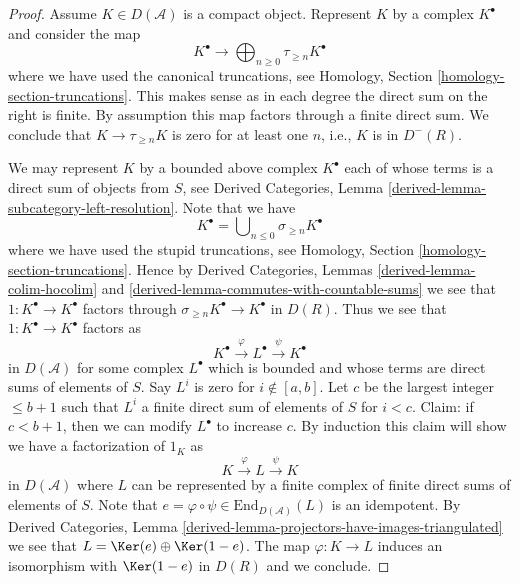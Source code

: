 \begin{proof}
Assume $K \in D(\mathcal{A})$ is a compact object. Represent $K$ by a complex
$K^\bullet$ and consider the map
$$
K^\bullet
\longrightarrow
\bigoplus\nolimits_{n \geq 0} \tau_{\geq n} K^\bullet
$$
where we have used the canonical truncations, see
Homology, Section \ref{homology-section-truncations}.
This makes sense as in each degree the direct sum on the right is finite.
By assumption this map factors through a finite direct sum.
We conclude that $K \to \tau_{\geq n} K$ is zero for at least one $n$,
i.e., $K$ is in $D^{-}(R)$.

\medskip\noindent
We may represent $K$ by a bounded above complex $K^\bullet$ each of whose
terms is a direct sum of objects from $S$, see
Derived Categories, Lemma \ref{derived-lemma-subcategory-left-resolution}.
Note that we have
$$
K^\bullet = \bigcup\nolimits_{n \leq 0} \sigma_{\geq n}K^\bullet
$$
where we have used the stupid truncations, see
Homology, Section \ref{homology-section-truncations}.
Hence by Derived Categories, Lemmas \ref{derived-lemma-colim-hocolim} and
\ref{derived-lemma-commutes-with-countable-sums}
we see that $1 : K^\bullet \to K^\bullet$ factors through
$\sigma_{\geq n}K^\bullet \to K^\bullet$ in $D(R)$.
Thus we see that $1 : K^\bullet \to K^\bullet$ factors as
$$
K^\bullet \xrightarrow{\varphi} L^\bullet \xrightarrow{\psi} K^\bullet
$$
in $D(\mathcal{A})$ for some complex $L^\bullet$ which is bounded and
whose terms are direct sums of elements of $S$. Say $L^i$ is zero for
$i \not \in [a, b]$. Let $c$ be the largest integer $\leq b + 1$ such
that $L^i$ a finite direct sum of elements of $S$ for $i < c$.
Claim: if $c < b + 1$, then we can modify $L^\bullet$ to increase $c$.
By induction this claim will show we have a factorization
of $1_K$ as
$$
K \xrightarrow{\varphi} L \xrightarrow{\psi} K
$$
in $D(\mathcal{A})$ where $L$ can be represented by a finite
complex of finite direct sums of elements of $S$. Note that
$e = \varphi \circ \psi \in \text{End}_{D(\mathcal{A})}(L)$
is an idempotent. By Derived Categories,
Lemma \ref{derived-lemma-projectors-have-images-triangulated}
we see that $L = \Ker(e) \oplus \Ker(1 - e)$.
The map $\varphi : K \to L$ induces an isomorphism with
$\Ker(1 - e)$ in $D(R)$ and we conclude.


\end{proof}

